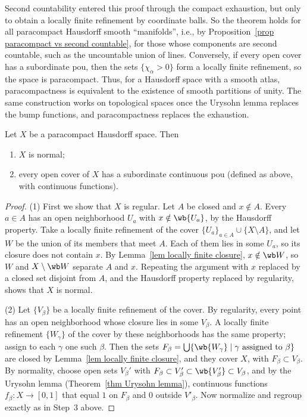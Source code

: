 Second countability entered this proof through the compact exhaustion, but only to obtain a locally finite refinement by coordinate balls. So the theorem holds for all paracompact Hausdorff smooth ``manifolds'', i.e., by Proposition~\ref{prop paracompact vs second countable}, for those whose components are second countable, such as the uncountable union of lines. Conversely, if every open cover has a subordinate \gls{pou}, then the sets $\{\chi_\alpha>0\}$ form a locally finite refinement, so the space is paracompact. Thus, for a Hausdorff space with a smooth atlas, paracompactness is equivalent to the existence of smooth partitions of unity. The same construction works on topological spaces once the Urysohn lemma replaces the bump functions, and paracompactness replaces the exhaustion.

\begin{thm}\label{thm continuous pou}
    Let $X$ be a paracompact Hausdorff space. Then
    \begin{enumerate}
        \item $X$ is normal;
        \item every open cover of $X$ has a subordinate continuous \gls{pou} (defined as above, with continuous functions).
    \end{enumerate}
\end{thm}
\begin{proof}
    (1) First we show that $X$ is regular. Let $A$ be closed and $x\notin A$. Every $a\in A$ has an open neighborhood $U_a$ with $x\notin\wb{U_a}$, by the Hausdorff property. Take a locally finite refinement of the cover $\{U_a\}_{a\in A}\cup\{X\setminus A\}$, and let $W$ be the union of its members that meet $A$. Each of them lies in some $U_a$, so its closure does not contain $x$. By Lemma~\ref{lem locally finite closure}, $x\notin\wb W$, so $W$ and $X\setminus\wb W$ separate $A$ and $x$. Repeating the argument with $x$ replaced by a closed set disjoint from $A$, and the Hausdorff property replaced by regularity, shows that $X$ is normal.

    (2) Let $\{V_\beta\}$ be a locally finite refinement of the cover. By regularity, every point has an open neighborhood whose closure lies in some $V_\beta$. A locally finite refinement $\{W_\gamma\}$ of the cover by these neighborhoods has the same property; assign to each $\gamma$ one such $\beta$. Then the sets $F_\beta=\bigcup\{\wb{W_\gamma}\mid\gamma\text{ assigned to }\beta\}$ are closed by Lemma~\ref{lem locally finite closure}, and they cover $X$, with $F_\beta\subset V_\beta$. By normality, choose open sets $V_\beta'$ with $F_\beta\subset V'_\beta\subset\wb{V_\beta'}\subset V_\beta$, and by the Urysohn lemma (Theorem~\ref{thm Urysohn lemma}), continuous functions $f_\beta:X\to[0,1]$ that equal $1$ on $F_\beta$ and $0$ outside $V'_\beta$. Now normalize and regroup exactly as in Step~3 above.
\end{proof}

